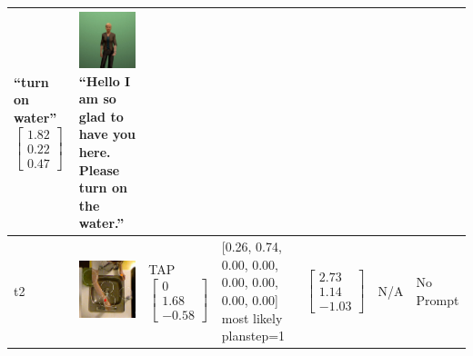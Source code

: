 \begin{longtable}{| V{0.8cm} | V{2.6cm} | V{1.6cm} | V{2.1cm} | V{1.55cm} | V{1.6cm} | V{3.2cm} |}
``turn on water''
\linebreak\linebreak
$\begin{bmatrix}
1.82 \\
0.22 \\
0.47
\end{bmatrix}$ &
\includegraphics[width=2.6cm]{fig/prompt/_please-turn-on-the-water_.jpg}
\linebreak
\footnotesize
``Hello I am so glad to have you here. Please turn on the water.''
\\ \hline


t2 &
\includegraphics[width=\linewidth]{fig/system/_fast2-tap1_.jpg} &
TAP
\linebreak\linebreak
$\begin{bmatrix}
0 \\
1.68 \\
-0.58
\end{bmatrix}$ &
[0.26, 0.74, 0.00, 0.00, 0.00, 0.00, 0.00, 0.00] most likely planstep=1 &
$\begin{bmatrix}
2.73 \\
1.14 \\
-1.03
\end{bmatrix}$ &
N/A &
No Prompt
\\ \hline



\end{longtable}
